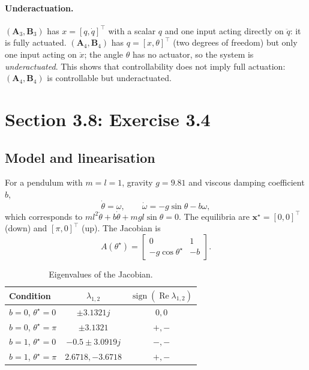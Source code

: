 \documentclass[11pt]{article}
\newcommand{\x}{\mathbf{x}}
\newcommand{\A}{\mathbf{A}}
\newcommand{\B}{\mathbf{B}}
\begin{document}
\paragraph{Underactuation.}
$(\A_3,\B_3)$ has $x=[q,\dot q]^\top$ with a scalar $q$ and one input acting
directly on $\ddot q$: it is fully actuated.  $(\A_4,\B_4)$ has
$q=[x,\theta]^\top$ (two degrees of freedom) but only one input acting on
$\ddot x$; the angle $\theta$ has no actuator, so the system is
\emph{underactuated}.  This shows that controllability does not imply full
actuation: $(\A_4,\B_4)$ is controllable but underactuated.

\section{Section 3.8: Exercise 3.4}

\subsection{Model and linearisation}

For a pendulum with $m=l=1$, gravity $g=9.81$ and viscous damping
coefficient $b$,
\begin{equation}
\dot\theta=\omega,\qquad
\dot\omega=-g\sin\theta-b\omega,
\end{equation}
which corresponds to
$ml^2\ddot\theta+b\dot\theta+mgl\sin\theta=0$.  The equilibria are
$\x^\star=[0,0]^\top$ (down) and $[\pi,0]^\top$ (up).  The Jacobian is
\begin{equation}
A(\theta^\star)=
\begin{bmatrix}
0&1\\
-g\cos\theta^\star&-b
\end{bmatrix}.
\end{equation}

\begin{table}[H]
\centering
\caption{Eigenvalues of the Jacobian.}
\begin{tabular}{lcc}
\toprule
Condition & $\lambda_{1,2}$ & $\operatorname{sign}(\operatorname{Re}\lambda_{1,2})$ \\
\midrule
$b=0$, $\theta^\star=0$ & $\pm3.1321j$ & $0,0$ \\
$b=0$, $\theta^\star=\pi$ & $\pm3.1321$ & $+,-$ \\
$b=1$, $\theta^\star=0$ & $-0.5\pm3.0919j$ & $-,-$ \\
$b=1$, $\theta^\star=\pi$ & $2.6718,-3.6718$ & $+,-$ \\
\bottomrule
\end{tabular}
\end{table}
\end{document}
